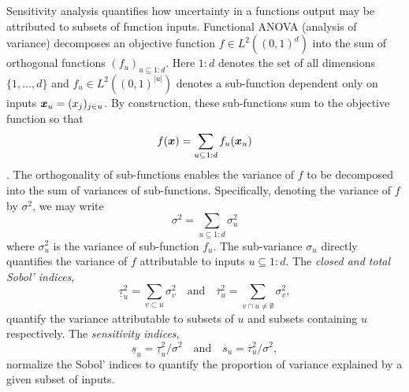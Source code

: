 \documentclass{article}[12pt]
\begin{document}
Sensitivity analysis quantifies how uncertainty in a functions output may be attributed to subsets of function inputs. Functional ANOVA (analysis of variance) decomposes an objective function $f \in L^2((0,1)^d)$ into the sum of orthogonal functions $(f_u)_{u \subseteq 1:d}$. Here $1:d$ denotes the set of all dimensions $\{1,\dots,d\}$ and $f_u \in L^2((0,1)^{\lvert u \rvert})$ denotes a sub-function dependent only on inputs $\boldsymbol{x}_u = (x_j)_{j \in u}$. By construction, these sub-functions sum to the objective function so that
\begin{equation*}
    f(\boldsymbol{x}) = \sum_{u \subseteq 1:d} f_u(\boldsymbol{x}_u)
\end{equation*}
\cite[Appendix A]{mcbook}. The orthogonality of sub-functions enables the variance of $f$ to be decomposed into the sum of variances of sub-functions. Specifically, denoting the variance of $f$ by $\sigma^2$, we may write
\begin{equation*}
    \sigma^2 = \sum_{u \subseteq 1:d} \sigma^2_u
\end{equation*}
where $\sigma^2_u$ is the variance of sub-function $f_u$. The sub-variance $\sigma_u$ directly quantifies the variance of $f$ attributable to inputs $u \subseteq 1:d$.  The \emph{closed and total Sobol' indices},
\begin{equation}
    \label{eq:sobol_indices}
    \underline{\tau}_u^2 = \sum_{v \subset u} \sigma^2_v \quad \text{and} \quad 
    \overline{\tau}_u^2 = \sum_{v \cap u \neq \emptyset} \sigma^2_v,
\end{equation}
quantify the variance attributable to subsets of $u$ and subsets containing $u$ respectively. The \emph{sensitivity indices},
\begin{equation}
    \label{eq:sensitivity_indices_og}
    \underline{s}_u = \underline{\tau}_u^2/\sigma^2 \quad \text{and} \quad 
    \overline{s}_u = \overline{\tau}_u^2/\sigma^2,
\end{equation}
normalize the Sobol' indices to quantify the proportion of variance explained by a given subset of inputs. 
\end{document}
